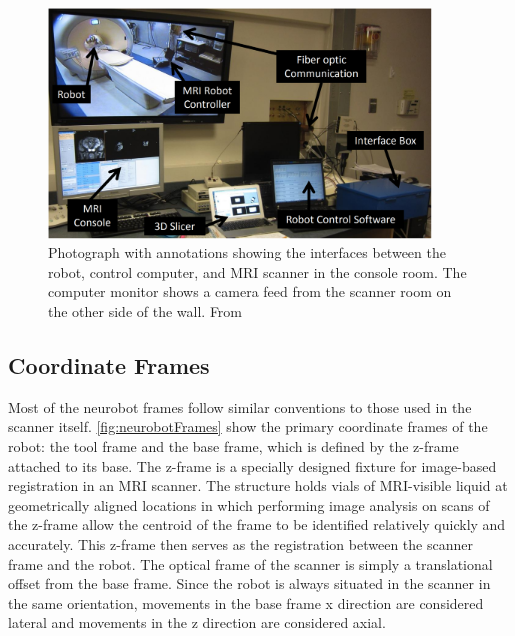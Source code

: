 \documentclass[12pt]{report}
\begin{document}
\begin{figure}[thpb]
	\centering
	\includegraphics[width=4in]{images/mri_console_room.png}
    \caption{Photograph with annotations showing the interfaces between the robot, control computer, and MRI scanner in the console room. The computer monitor shows a camera feed from the scanner room on the other side of the wall. From \cite{neurobotIEEE2015}}
    \label{fig:networkDiagram}
\end{figure}

\subsection{Coordinate Frames}
Most of the neurobot frames follow similar conventions to those used in the scanner itself. \autoref{fig:neurobotFrames} show the primary coordinate frames of the robot: the tool frame and the base frame, which is defined by the z-frame attached to its base. The z-frame is a specially designed fixture for image-based registration in an MRI scanner. The structure holds vials of MRI-visible liquid at geometrically aligned locations in which performing image analysis on scans of the z-frame allow the centroid of the frame to be identified relatively quickly and accurately. \cite{zFrame} This z-frame then serves as the registration between the scanner frame and the robot. The optical frame of the scanner is simply a translational offset from the base frame. Since the robot is always situated in the scanner in the same orientation, movements in the base frame x direction are considered lateral and movements in the z direction are considered axial.
\end{document}
